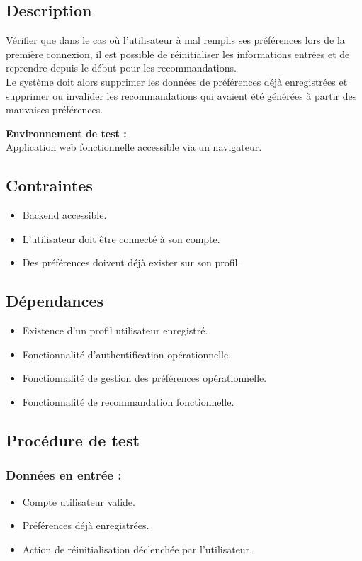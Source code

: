 \documentclass[a4paper,12pt]{report}
\begin{document}
\subsection*{Description}
Vérifier que dans le cas où l’utilisateur à mal remplis ses préférences lors de la première connexion, il est possible de réinitialiser les informations entrées et de reprendre depuis le début pour les recommandations.\\ 
Le système doit alors supprimer les données de préférences déjà enregistrées et supprimer ou invalider les recommandations qui avaient été générées à partir des mauvaises préférences.

\textbf{Environnement de test : }\\
Application web fonctionnelle accessible via un navigateur.

\subsection*{Contraintes}
\begin{itemize}
    \item Backend accessible.
    \item L’utilisateur doit être connecté à son compte.
    \item Des préférences  doivent déjà exister sur son profil.
\end{itemize}

\subsection*{Dépendances}
\begin{itemize}
    \item Existence d'un profil utilisateur enregistré.
    \item Fonctionnalité d'authentification opérationnelle.
    \item Fonctionnalité de gestion des préférences opérationnelle.
    \item Fonctionnalité de recommandation fonctionnelle.
\end{itemize}

\subsection*{Procédure de test}
\subsubsection{Données en entrée :}
\begin{itemize}
    \item Compte utilisateur valide.
    \item Préférences déjà enregistrées.
    \item Action de réinitialisation déclenchée par l’utilisateur.
\end{itemize}
\end{document}
